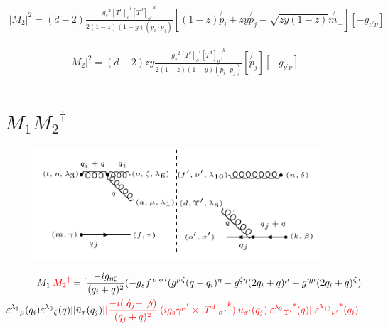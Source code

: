 \begin{equation}
\begin{split}
|M_2|^2=(d-2)\frac{{g_s}^2 {[T^c]_o}^l {[T^d]_{o\:^{\prime}}}^k}{2(1-z)(1-y)(p_i \cdot p_j)}
[(1-z) \not{p_i}+zy \not{p_j} - \sqrt{zy(1-z)} \not{{m}_{\bot}}]
[-g_{{\nu}^{\prime}{\nu}}]
\end{split}
\end{equation}

\begin{equation}
\begin{split}
|M_2|^2=(d-2)zy\frac{{g_s}^2 {[T^c]_o}^l {[T^d]_{o\:^{\prime}}}^k}{2(1-z)(1-y)(p_i \cdot p_j)}
[\not{p_j}]
[-g_{{\nu}^{\prime}{\nu}}]
\end{split}
\end{equation}







\section{$M_1 {M_2}^{\dagger}$}
\begin{figure}[ht!]
\centering
\includegraphics[width=0.95\textwidth]{images/ggqM1M2dagger.png}
\end{figure}
\begin{equation}
\begin{split}
M_1\:{\color[RGB]{255,0,0} {M_2}^{\dagger}}=[\frac{-ig_{{\eta}{\zeta}}}{(q_i +q)^2}(-g_s f^{\:a\:o\:l}(g^{{\mu}{\zeta}}(q-q_i)^{\eta}-g^{{\zeta}{\eta}}(2q_i +q)^{\mu}+g^{{\eta}{\mu}}(2q_i +q)^{\zeta})\\
{\varepsilon^{\lambda_1}}_{\mu} (q_i) {\varepsilon^{\lambda_6}}_{\zeta} (q)][\bar{u}_{\tau}(q_j)]
{\color[RGB]{255,0,0}[\frac{-i(\not{q_j} + \not{q})}{(q_j + q)^2} \:  (ig_s \gamma^{{\mu}^{\prime}}\times {[T^d]_{o\:^{\prime}}}^k) \: u_{{\sigma}^{\prime}}(q_j) \: {{\varepsilon^{\lambda_8}}_{{\Upsilon}^{\prime}}}^* (q)][{{\varepsilon^{\lambda_{10}}}_{{\nu}^{\prime}}}^* (q_i)]}
\end{split}
\end{equation}


